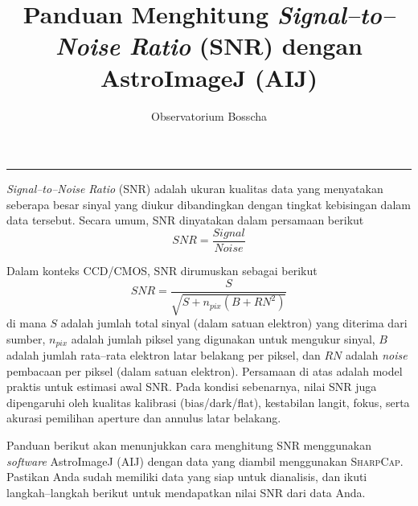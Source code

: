 \documentclass[12pt,a4paper]{article}
\title{\textbf{Panduan Menghitung \textit{Signal--to--Noise Ratio} (SNR)} dengan AstroImageJ (AIJ)}
\author{Observatorium Bosscha}
\begin{document}
\maketitle
\noindent\rule{\linewidth}{0.4pt}

\textit{Signal--to--Noise Ratio} (SNR) adalah ukuran kualitas data yang menyatakan seberapa besar sinyal yang diukur dibandingkan dengan tingkat kebisingan dalam data tersebut. Secara umum, SNR dinyatakan dalam persamaan berikut
\begin{equation}
	SNR = \frac{Signal}{Noise}
\end{equation}

Dalam konteks CCD/CMOS, SNR dirumuskan sebagai berikut
\begin{equation}
	SNR = \frac{S}{\sqrt{S + n_{pix} (B + RN^2)}}
\end{equation}
di mana $S$ adalah jumlah total sinyal (dalam satuan elektron) yang diterima dari sumber, $n_{pix}$ adalah jumlah piksel yang digunakan untuk mengukur sinyal, $B$ adalah jumlah rata--rata elektron latar belakang per piksel, dan $RN$ adalah \textit{noise} pembacaan per piksel (dalam satuan elektron).
Persamaan di atas adalah model praktis untuk estimasi awal SNR. Pada kondisi sebenarnya, nilai SNR juga dipengaruhi oleh kualitas kalibrasi (bias/dark/flat), kestabilan langit, fokus, serta akurasi pemilihan aperture dan annulus latar belakang.

Panduan berikut akan menunjukkan cara menghitung SNR menggunakan \textit{software} AstroImageJ (AIJ) dengan data yang diambil menggunakan \textsc{SharpCap}. Pastikan Anda sudah memiliki data yang siap untuk dianalisis, dan ikuti langkah--langkah berikut untuk mendapatkan nilai SNR dari data Anda.
\end{document}
